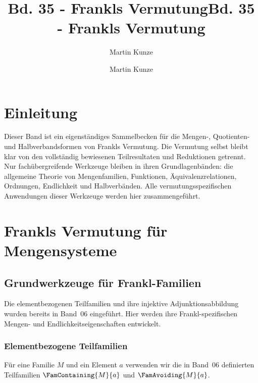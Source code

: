 \documentclass[main.tex]{subfiles}
\title{Bd. 35 - Frankls Vermutung}
\author{Martin Kunze}
\date{}
\begin{document}
\title{Bd. 35 - Frankls Vermutung}
\author{Martin Kunze}
\date{}
\hypersetup{pageanchor=false}
\maketitle
\hypersetup{pageanchor=true}
\setcounter{tocdepth}{3}
\tableofcontents
\setcounter{file}{35}
\renewcommand{\FormulaBandID}{35}
\newcommand{\ProofRefStack}[1]{%
  \ensuremath{\begin{gathered}#1\end{gathered}}}

\chapter{Einleitung}

Dieser Band ist ein eigenständiges Sammelbecken für die Mengen-, Quotienten-
und Halbverbandsformen von Frankls Vermutung. Die Vermutung selbst bleibt
klar von den vollständig bewiesenen Teilresultaten und Reduktionen getrennt.
Nur fachübergreifende Werkzeuge bleiben in ihren Grundlagenbänden: die
allgemeine Theorie von Mengenfamilien, Funktionen, Äquivalenzrelationen,
Ordnungen, Endlichkeit und Halbverbänden. Alle vermutungsspezifischen
Anwendungen dieser Werkzeuge werden hier zusammengeführt.

\chapter{Frankls Vermutung für Mengensysteme}

\section{Grundwerkzeuge für Frankl-Familien}

Die elementbezogenen Teilfamilien und ihre injektive Adjunktionsabbildung
wurden bereits in Band~06 eingeführt. Hier werden ihre
Frankl-spezifischen Mengen- und Endlichkeitseigenschaften entwickelt.

\subsection{Elementbezogene Teilfamilien}

Für eine Familie \(M\) und ein Element \(a\) verwenden wir die in Band~06
definierten Teilfamilien \(\FamContaining{M}{a}\) und
\(\FamAvoiding{M}{a}\).

\begin{tabproof}
\end{tabproof}
\end{document}
